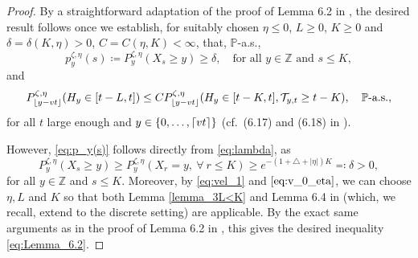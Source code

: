 \documentclass[12pt,reqno,oneside]{amsart}
\numberwithin{equation}{section}
\theoremstyle{definition}
\theoremstyle{remark}
\newcommand{\Z}{\mathbb{Z}}
\newcommand{\PP}{\mathbb{P}}
\DeclarePairedDelimiter{\ceil}{\lceil}{\rceil}
\DeclarePairedDelimiter{\floor}{\lfloor}{\rfloor}
\begin{document}
\begin{proof}
By a straightforward adaptation of the proof of Lemma 6.2 in \cite{CDO25}, the desired result follows once we establish, for suitably chosen $\eta \leq 0$, $ L \geq 0$, $K \geq0$ and $\delta=\delta(K,\eta)>0$, $C=C(\eta, K)< \infty$, that, $\PP$-a.s.,
\begin{equation}\label{eq:p_y(s)}
    p_y^{\zeta, \eta}(s)\coloneq P_y^{\zeta,\eta}(X_s \geq y) \geq \delta, \quad \text{for all }y \in \Z \text{ and } s \leq K,
\end{equation}
and
\begin{equation}\label{eq:Lemma_6.2}
    P^{\zeta, \eta}_{\floor{y-vt}}(H_y \in [t-L,t]) \leq C P^{\zeta, \eta}_{\floor{y-vt}}(H_y \in [t-K,t], \mathcal{T}_{y,t} \geq t-K), \quad \PP \text{-a.s.},
\end{equation}
for all $t$ large enough and  $y \in \{0,\dots, \ceil{vt} \}$ (cf.~(6.17) and (6.18) in \cite{CDO25}).

However, \eqref{eq:p_y(s)} follows directly from \eqref{eq:lambda}, as
  \begin{equation*}
     P_y^{\zeta,\eta}(X_s \geq y)
    \geq P_y^{\zeta,\eta}(X_r=y, \ \forall \ r \leq K )
    \geq e^{-(1+\triangle + |\eta| )K} \eqcolon \delta>0,
  \end{equation*}
   for all $y \in \Z$  and $s \leq K$. Moreover, by \eqref{eq:vel_1} and $\eqref{eq:v_0_eta}$, we can choose $\eta,L$ and $K$ so that both Lemma \ref{lemma_3L<K} and Lemma 6.4 in \cite{CDO25} (which, we recall, extend to the discrete setting) are applicable. By the exact same arguments as in the proof of Lemma 6.2 in \cite{CDO25}, this gives the desired inequality \eqref{eq:Lemma_6.2}.
\end{proof}
\end{document}
